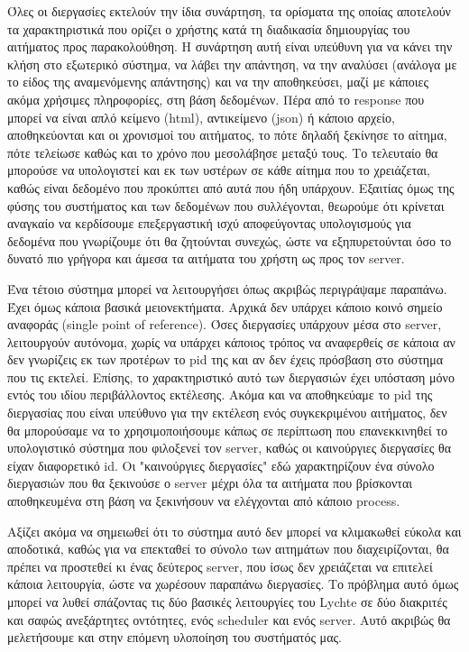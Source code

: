 Όλες οι διεργασίες εκτελούν την ίδια συνάρτηση, τα ορίσματα της οποίας αποτελούν τα χαρακτηριστικά που ορίζει ο χρήστης
κατά τη διαδικασία δημιουργίας του αιτήματος προς παρακολούθηση. Η συνάρτηση αυτή είναι υπεύθυνη για να κάνει την κλήση στο εξωτερικό
σύστημα, να λάβει την απάντηση, να την αναλύσει (ανάλογα με το είδος της αναμενόμενης απάντησης) και να την αποθηκεύσει,
μαζί με κάποιες ακόμα χρήσιμες πληροφορίες, στη βάση δεδομένων. Πέρα από το response που μπορεί να είναι απλό κείμενο (html), αντικείμενο (json) ή κάποιο
αρχείο, αποθηκεύονται και οι χρονισμοί του αιτήματος, το πότε δηλαδή ξεκίνησε το αίτημα, πότε τελείωσε καθώς και το χρόνο που μεσολάβησε μεταξύ τους. Το τελευταίο
θα μπορούσε να υπολογιστεί και εκ των υστέρων σε κάθε αίτημα που το χρειάζεται, καθώς είναι δεδομένο που προκύπτει από αυτά που ήδη υπάρχουν.
Εξαιτίας όμως της φύσης του συστήματος και των δεδομένων που συλλέγονται,
θεωρούμε ότι κρίνεται αναγκαίο να κερδίσουμε επεξεργαστική ισχύ αποφεύγοντας υπολογισμούς
για δεδομένα που γνωρίζουμε ότι θα ζητούνται συνεχώς, ώστε να εξηπυρετούνται όσο το δυνατό
πιο γρήγορα και άμεσα τα αιτήματα του χρήστη ως προς τον server.

Ένα τέτοιο σύστημα μπορεί να λειτουργήσει όπως ακριβώς περιγράψαμε παραπάνω. Έχει όμως κάποια βασικά μειονεκτήματα.
Αρχικά δεν υπάρχει κάποιο κοινό σημείο αναφοράς (single point of reference). Όσες διεργασίες υπάρχουν μέσα στο server, λειτουργούν αυτόνομα,
χωρίς να υπάρχει κάποιος τρόπος να αναφερθείς σε κάποια αν δεν γνωρίζεις εκ των προτέρων το pid της και αν δεν έχεις πρόσβαση
στο σύστημα που τις εκτελεί. Επίσης, το χαρακτηριστικό αυτό των διεργασιών έχει υπόσταση μόνο εντός του ιδίου περιβάλλοντος εκτέλεσης. Ακόμα και
να αποθηκεύαμε το pid της διεργασίας που είναι υπεύθυνο για την εκτέλεση ενός συγκεκριμένου αιτήματος, δεν θα μπορούσαμε να το χρησιμοποιήσουμε
κάπως σε περίπτωση που επανεκκινηθεί το υπολογιστικό σύστημα που φιλοξενεί τον server, καθώς οι καινούργιες διεργασίες θα είχαν διαφορετικό id.
Οι "καινούργιες διεργασίες" εδώ χαρακτηρίζουν ένα σύνολο διεργασιών που θα ξεκινούσε ο server μέχρι όλα τα αιτήματα που βρίσκονται αποθηκευμένα στη βάση
να ξεκινήσουν να ελέγχονται από κάποιο process.

Αξίζει ακόμα να σημειωθεί ότι το σύστημα αυτό δεν μπορεί να κλιμακωθεί εύκολα και αποδοτικά, καθώς
για να επεκταθεί το σύνολο των αιτημάτων που διαχειρίζονται, θα πρέπει να προστεθεί κι ένας δεύτερος server, που ίσως δεν χρειάζεται να επιτελεί κάποια λειτουργία,
ώστε να χωρέσουν παραπάνω διεργασίες. Το πρόβλημα αυτό όμως μπορεί να λυθεί σπάζοντας τις δύο βασικές λειτουργίες του
Lychte σε δύο διακριτές και σαφώς ανεξάρτητες οντότητες, ενός scheduler και ενός server. Αυτό ακριβώς θα μελετήσουμε και στην επόμενη υλοποίηση του συστήματός μας.

